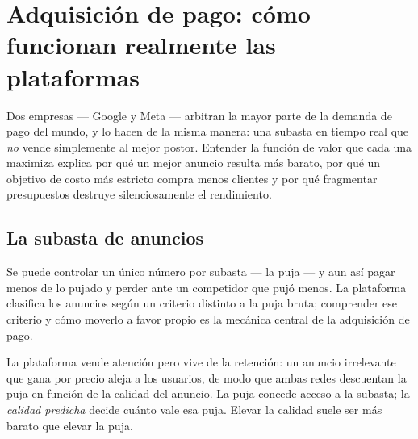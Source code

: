 \chapter{Adquisición de pago: cómo funcionan realmente las plataformas}\label{ch:paid-acquisition-platforms}


Dos empresas --- Google y Meta --- arbitran la mayor parte de la demanda de pago del mundo, y lo hacen de la misma manera: una subasta en tiempo real que \emph{no} vende simplemente al mejor postor. Entender la función de valor que cada una maximiza explica por qué un mejor anuncio resulta más barato, por qué un objetivo de costo más estricto compra menos clientes y por qué fragmentar presupuestos destruye silenciosamente el rendimiento.

\section{La subasta de anuncios}\label{sec:ad-auction}

Se puede controlar un único número por subasta --- la puja --- y aun así pagar menos de lo pujado y perder ante un competidor que pujó menos. La plataforma clasifica los anuncios según un criterio distinto a la puja bruta; comprender ese criterio y cómo moverlo a favor propio es la mecánica central de la adquisición de pago.

La plataforma vende atención pero vive de la retención: un anuncio irrelevante que gana por precio aleja a los usuarios, de modo que ambas redes descuentan la puja en función de la calidad del anuncio. La puja concede acceso a la subasta; la \emph{calidad predicha} decide cuánto vale esa puja. Elevar la calidad suele ser más barato que elevar la puja.

